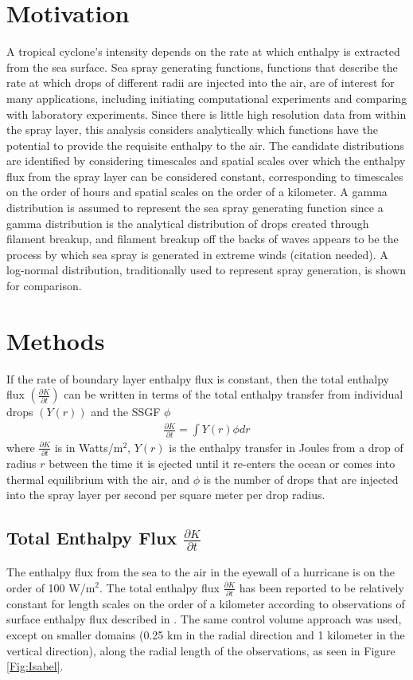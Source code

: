 \documentclass[17pt,a4paper]{article}
\begin{document}
\section{Motivation}
A tropical cyclone's intensity depends on the rate at which enthalpy is extracted from the sea surface. Sea spray generating functions, functions that describe the rate at which drops of different radii are injected into the air, are of interest for many applications, including initiating computational experiments and comparing with laboratory experiments. Since there is little high resolution data from within the spray layer, this analysis considers analytically which functions have the potential to provide the requisite enthalpy to the air. The candidate distributions are identified by considering timescales and spatial scales over which the enthalpy flux from the spray layer can be considered constant, corresponding to timescales on the order of hours and spatial scales on the order of a kilometer. A gamma distribution is assumed to represent the sea spray generating function since a gamma distribution is the analytical distribution of drops created through filament breakup, and filament breakup off the backs of waves appears to be the process by which sea spray is generated in extreme winds (citation needed). A log-normal distribution, traditionally used to represent spray generation, is shown for comparison. 

\section{Methods}
If the rate of boundary layer enthalpy flux is constant, then the total enthalpy flux $\left(\frac{\partial K}{\partial t} \right)$ can be written in terms of the total enthalpy transfer from individual drops $\left(Y(r)\right)$ and the SSGF $\phi$ 
\begin{align}
\frac{\partial K}{\partial t	} = \int Y(r) \phi dr\label{Eq:TotalEnthalpy}
\end{align}
where $\frac{\partial K}{\partial t	}$ is in Watts/m$^2$, $Y(r)$ is the enthalpy transfer in Joules from a drop of radius $r$ between the time it is ejected until it re-enters the ocean or comes into thermal equilibrium with the air, and $\phi $ is the number of drops that are injected into the spray layer per second per square meter per drop radius.
\subsection{Total Enthalpy Flux $\frac{\partial K}{\partial t	}$}
The enthalpy flux from the sea to the air in the eyewall of a hurricane is on the order of 100 W/m$^2$. The total enthalpy flux $\frac{\partial K}{\partial t}$ has been reported to be relatively constant for length scales on the order of a kilometer according to observations of surface enthalpy flux described in \citet{Bell2012}. The same control volume approach was used, except on smaller domains (0.25 km in the radial direction and 1 kilometer in the vertical direction), along the radial length of the observations, as seen in Figure \ref{Fig:Isabel}.\par 
\end{document}
